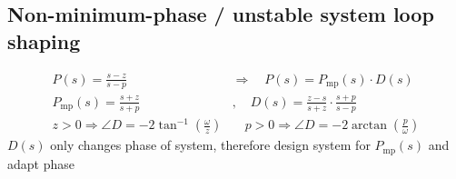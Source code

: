 \subsection{Non-minimum-phase / unstable system loop shaping}
\begin{align*}
    P(s) = \frac{s - z}{s - p} %
    \quad &\Rightarrow \quad P(s) = P_{\text{mp}}(s) \cdot D(s)\\
    P_{\text{mp}}(s) = \frac{s + z}{s + p}\quad &, \quad
    D(s) = \frac{z - s}{s + z} \cdot \frac{s + p}{s - p}\\
    z > 0 \Rightarrow \angle D = -2 \tan^{-1}(\frac{\omega}{z}) &\quad
    p > 0 \Rightarrow \angle D = -2 \arctan(\frac{p}{\omega})
\end{align*}
$D(s)$ only changes phase of system, therefore design system for $P_{\text{mp}}(s)$ and adapt phase